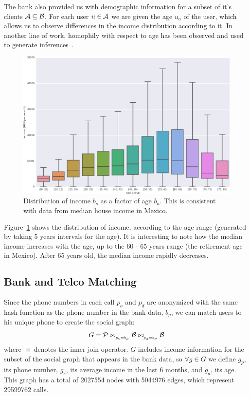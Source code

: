 The bank also provided us with demographic information for a subset of it's clients \( \mathcal{A} \subseteq \mathcal{B} \). For each user \( u \in \mathcal{A} \) we are given the age \( u_a \) of the user, which allows us to observe differences in the income distribution according to it. In another line of work, homophily with respect to age has been observed and used to generate inferences~\cite{brea2014}.

\begin{figure}[h]
\begin{center}
\includegraphics[width=0.95\columnwidth]{figures/income_age_boxplot4/income_age_boxplot4.png}
\caption{Distribution of income $b_s$ as a factor of age $b_a$. This is consistent with data from median house income in Mexico\cite{gallup2013}.}
\label{income_age_boxplot}
\end{center}
\end{figure}

Figure~\ref{income_age_boxplot} shows the distribution of income, according to the age range (generated by taking 5 years intervals for the age).
It is interesting to note how the median income increases with the age, up to
the 60 - 65 years range (the retirement age in Mexico). After 65 years old, the median income rapidly decreases.


\subsection{Bank and Telco Matching}

Since the phone numbers in each call $ p_o $ and $ p_d $ are anonymized with the same hash function as the phone number in the bank data, $ b_p $, we can match users to his unique phone to create the social graph:
$$ G = \mathcal{P} \bowtie_{_{p_o = b_p}} \mathcal{B} \bowtie_{_{p_d = b_p}} \mathcal{B} $$
where $\bowtie$ denotes the inner join operator.
$G$ includes income information for the subset of the social graph that appears in the bank data, so \( \forall g \in G \) we define \( g_p \), its phone number, \( g_s \), its average income in the last 6 months, and \( g_a \), its age.
This graph has a total of \num{2027554} nodes with \num{5044976} edges, which represent \num{29599762} calls. %


